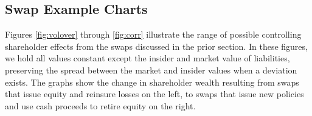 

\subsection{Swap Example Charts}
Figures \ref{fig:volover} through \ref{fig:corr} illustrate the range of possible controlling shareholder effects from the swaps discussed in the prior section.  In these figures, we hold all values constant except the insider and market value of liabilities, preserving the spread between the market and insider values when a deviation exists.  The graphs show the change in shareholder wealth resulting from swaps that issue equity and reinsure losses on the left, to swaps that issue new policies and use cash proceeds to retire equity on the right.

